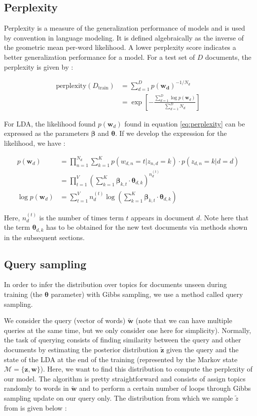\documentclass{article}
\begin{document}
\subsection{Perplexity}
Perplexity is a measure of the generalization performance of models and is used by convention in language modeling. It is defined algebraically as the inverse of the geometric mean per-word likelihood. A lower perplexity score indicates a better generalization performance for a model. For a test set of $D$ documents, the perplexity is given by :

\begin{align}\label{eq:perplexity}
\mathrm{perplexity}(D_{\mathrm{train}}) & = \sum_{d=1}^{D} p(\mathbf{w_d})^{-1/N_d} \nonumber\\
										& = \exp\left[-\frac{\sum_{d=1}^D \log p(\mathbf{w}_d)}{\sum_{d=1}^D N_d}\right]
\end{align}

For LDA, the likelihood found $p(\mathbf{w}_d)$ found in equation \ref{eq:perplexity} can be expressed as the parameters $\bm{\beta}$ and $\bm{\theta}$. If we develop the expression for the likelihood, we have :

\begin{align}
p(\mathbf{w}_d) & = \prod_{n=1}^{N_d} \sum_{k=1} ^K p(w_{d,n}=t|z_{n,d}=k) \cdot p(z_{d,n}=k|d=d) \nonumber\\
				& = \prod_{t=1}^{V} \left( \sum_{k=1}^K \bm{\beta}_{k,t} \cdot \bm{\theta}_{d,k} \right)^{n_d ^{(t)}}\nonumber\\
\log p(\mathbf{w}_d) & = \sum_{t=1}^V n_d ^{(t)} \log \left( \sum_{k=1}^K \bm{\beta}_{k,t} \cdot \bm{\theta}_{d,k} \right)
\end{align}

Here, $n_d ^{(t)}$ is the number of times term $t$ appears in document $d$. Note here that the term $\bm{\theta}_{d,k}$ has to be obtained for the new test documents via methods shown in the subsequent sections.

\subsection{Query sampling}

In order to infer the distribution over topics for documents unseen during training (the $\bm{\theta}$ parameter) with Gibbs sampling, we use a method called query sampling.

We consider the query (vector of words) $\tilde{\mathbf{w}}$ (note that we can have multiple queries at the same time, but we only consider one here for simplicity). Normally, the task of querying consists of finding similarity between the query and other documents by estimating the posterior distribution $\tilde{\mathbf{z}}$ given the query and the state of the LDA at the end of the training (represented by the Markov state $\bm{\mathcal{M}}=\{ \mathbf{z},\mathbf{w} \}$). Here, we want to find this distribution to compute the perplexity of our model. The algorithm is pretty straightforward and consists of assign topics randomly to words in $\tilde{\mathbf{w}}$ and to perform a certain number of loops through Gibbs sampling update on our query only. The distribution from which we sample $\tilde{z}$ from is given below :
\end{document}
